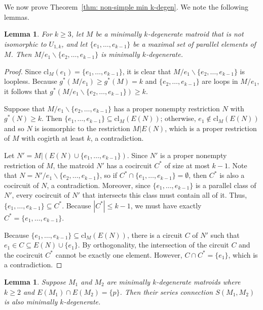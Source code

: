 \documentclass{amsart}
\newcommand{\ba}{\backslash}
\newcommand{\cl}{\mathrm{cl}}
\newtheorem{lemma}[theorem]{Lemma}
\theoremstyle{definition}
\theoremstyle{remark}
\numberwithin{equation}{section}
\begin{document}
We now prove Theorem~\ref{thm: non-simple min k-degen}. We note the following lemmas.

\begin{lemma}
\label{lem: parallel_class}
For $k \geq 3$, let $M$ be a minimally $k$-degenerate matroid that is not isomorphic to $U_{1,k}$, and let $\{e_1, \ldots, e_{k-1}\}$ be a maximal set of parallel elements of $M$. Then $M/e_1\ba \{e_2, \ldots, e_{k-1}\}$ is minimally $k$-degenerate.
\end{lemma}

\begin{proof}
Since $\cl_M(e_1)=\{e_1, \ldots, e_{k-1}\}$, it is clear that $M/e_1\ba \{e_2, \ldots, e_{k-1}\}$ is loopless. Because $g^*(M/e_1)\geq g^*(M)=k$ and $\{e_2, \ldots, e_{k-1}\}$ are loops in $M/e_1$, it follows that $g^*(M/e_1\ba \{e_2, \ldots, e_{k-1}\})\geq k$. 

Suppose that $M/e_1\ba \{e_2, \ldots, e_{k-1}\}$ has a proper nonempty restriction $N$ with $g^*(N)\ge k$. Then $\{e_1,\ldots, e_{k-1}\}\subseteq \cl_M(E(N))$; otherwise, $e_1 \notin \cl_M(E(N))$ and so $N$ is isomorphic to the restriction $M|E(N)$, which is a proper restriction of $M$ with cogirth at least $k$, a contradiction. 

Let $N'=M|(E(N)\cup\{e_1, \ldots, e_{k-1}\})$. Since $N'$ is a proper nonempty restriction of $M$, the matroid $N'$ has a cocircuit $C^*$ of size at most $k-1$. Note that $N = N'/e_1\ba \{e_2, \ldots, e_{k-1}\}$, so if $C^*\cap \{e_1, \ldots, e_{k-1}\}=\emptyset$, then $C^*$ is also a cocircuit of $N$, a contradiction. Moreover, since $\{e_1, \ldots, e_{k-1}\}$ is a parallel class of $N'$, every cocircuit of $N'$ that intersects this class must contain all of it. Thus, $\{e_1, \ldots, e_{k-1}\} \subseteq C^*$. Because $|C^*| \leq k-1$, we must have exactly $C^*=\{e_1, \ldots, e_{k-1}\}$. 

Because $\{e_1,\ldots, e_{k-1}\}\subseteq \cl_M(E(N))$, there is a circuit $C$ of $N'$ such that $e_1 \in C\subseteq E(N)\cup\{e_1\}$. By orthogonality, the intersection of the circuit $C$ and the cocircuit $C^*$ cannot be exactly one element. However, $C \cap C^* = \{e_1\}$, which is a contradiction. 
\end{proof}

\begin{lemma}
\label{lem: series connection}
    Suppose $M_1$ and $M_2$ are minimally $k$-degenerate matroids where $k\geq 2$ and $E(M_1)\cap E(M_2)=\{p\}$. Then their series connection $S(M_1,M_2)$ is also minimally $k$-degenerate.
\end{lemma}
\end{document}
